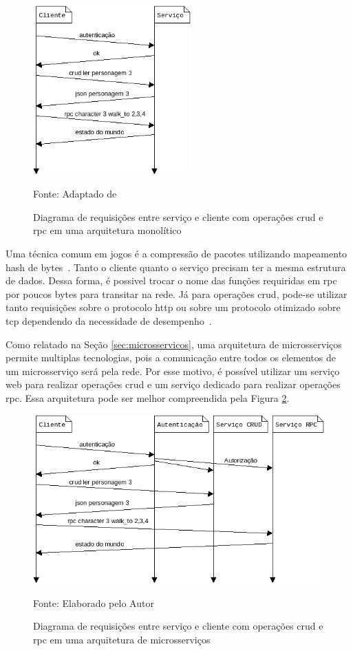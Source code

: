 \begin{figure}[htb!]
\caption{Diagrama de requisições entre serviço e cliente com operações \ac{crud} e \ac{rpc} em uma arquitetura monolítico}
\label{fig:network_crud_rpc}
\includegraphics[height=6.5cm]{img/cap2/network_rpc_crud.png}
\centering

Fonte: Adaptado de~\cite{LeckyThompson2008Nov}
\end{figure}



Uma técnica comum em jogos é a compressão de pacotes utilizando mapeamento hash de bytes~\cite{LeckyThompson2008Nov}.
%
Tanto o cliente quanto o serviço precisam ter a mesma estrutura de dados.
%
Dessa forma, é possivel trocar o nome das funções requiridas em \ac{rpc} por poucos bytes para transitar na rede.
%
Já para operações \ac{crud}, pode-se utilizar tanto requisições sobre o protocolo \ac{http} ou sobre um protocolo otimizado sobre \ac{tcp} dependendo da necessidade de desempenho~\cite{LeckyThompson2008Nov}.

Como relatado na Seção \ref{sec:microsservicos}, uma arquitetura de microsserviços permite multiplas tecnologias, pois a comunicação entre todos os elementos de um microsserviço será pela rede.
%
Por esse motivo, é possível utilizar um serviço web para realizar operações \ac{crud} e um serviço dedicado para realizar operações \ac{rpc}.
%
Essa arquitetura pode ser melhor compreendida pela Figura \ref{fig:network_crud_rpc_micro}.



\begin{figure}[htb!]
\caption{Diagrama de requisições entre serviço e cliente com operações \ac{crud} e \ac{rpc} em uma arquitetura de microsserviços}
\label{fig:network_crud_rpc_micro}
\includegraphics[height=6.5cm]{img/cap2/network_rpc_crud_micro.png}
\centering

Fonte: Elaborado pelo Autor
\end{figure}



